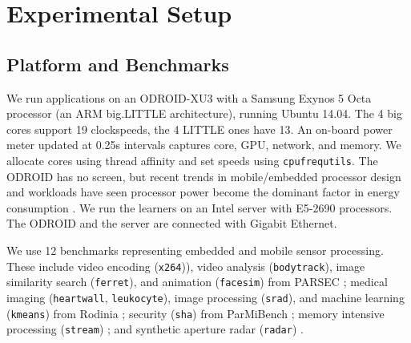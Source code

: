 \section{Experimental Setup}


\subsection{Platform and Benchmarks}
We run applications on an ODROID-XU3 with a Samsung Exynos 5 Octa
processor (an ARM big.LITTLE architecture), running Ubuntu 14.04. The
4 big cores support 19 clockspeeds, the 4 LITTLE ones have 13.  An
on-board power meter updated at 0.25s intervals captures core, GPU,
network, and memory. We allocate cores using thread affinity and set
speeds using \texttt{cpufrequtils}.  The ODROID has no screen, but
recent trends in mobile/embedded processor design and workloads have
seen processor power become the dominant factor in energy consumption
\cite{HPCA2016}.  We run the learners on an Intel server with E5-2690
processors.  The ODROID and the server are connected with Gigabit
Ethernet.

We use 12 benchmarks representing embedded and mobile sensor
processing.  These include video encoding (\texttt{x264})), video
analysis (\texttt{bodytrack}), image similarity search
(\texttt{ferret}), and animation (\texttt{facesim}) from PARSEC
\cite{parsec}; medical imaging (\texttt{heartwall},
\texttt{leukocyte}), image processing (\texttt{srad}), and machine
learning (\texttt{kmeans}) from Rodinia \cite{rodinia}; security
(\texttt{sha}) from ParMiBench \cite{parmibench}; memory intensive
processing (\texttt{stream}) \cite{stream}; and synthetic aperture
radar (\texttt{radar}) \cite{radar}.


